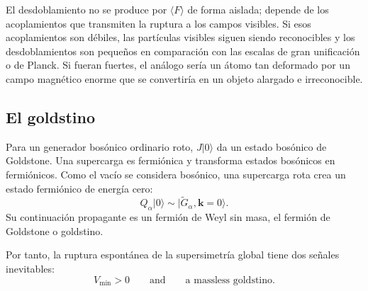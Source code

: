 \begin{classroomqa}
\end{classroomqa}

El desdoblamiento no se produce por \(\langle F\rangle\) de forma aislada; depende de los acoplamientos que transmiten la ruptura a los campos visibles. Si esos acoplamientos son débiles, las partículas visibles siguen siendo reconocibles y los desdoblamientos son pequeños en comparación con las escalas de gran unificación o de Planck. Si fueran fuertes, el análogo sería un átomo tan deformado por un campo magnético enorme que se convertiría en un objeto alargado e irreconocible.

\subsection{El goldstino}

Para un generador bosónico ordinario roto, \(J|0\rangle\) da un estado bosónico de Goldstone. Una supercarga es fermiónica y transforma estados bosónicos en fermiónicos. Como el vacío se considera bosónico, una supercarga rota crea un estado fermiónico de energía cero:
\begin{equation}
Q_\alpha|0\rangle
\sim
|\widetilde G_\alpha,\mathbf k=0\rangle.
\label{eq:l9-goldstino}
\end{equation}
Su continuación propagante es un fermión de Weyl sin masa, el fermión de Goldstone o goldstino.

\begin{classroomqa}
\end{classroomqa}

Por tanto, la ruptura espontánea de la supersimetría global tiene dos señales inevitables:
\begin{equation}
\boxed{
V_{\min}>0
\qquad\text{and}\qquad
\text{a massless goldstino}.
}
\label{eq:l9-rigid-breaking-signatures}
\end{equation}

